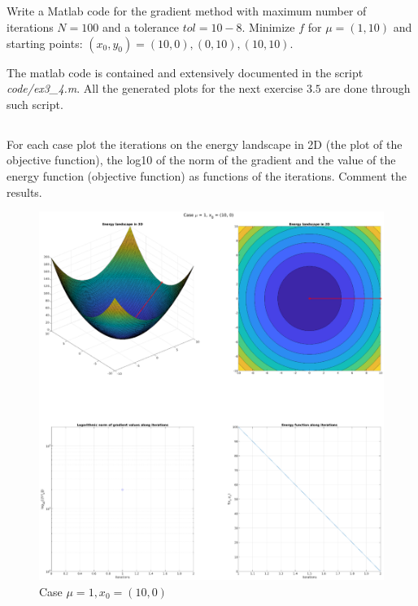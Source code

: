 \documentclass[unicode,11pt,a4paper,oneside,numbers=endperiod,openany]{scrartcl}
\begin{document}
\subsection{}
Write a Matlab code for the gradient method with maximum number of iterations $N = 100$ and a tolerance $tol = 10-8$. 
Minimize $f$ for $\mu = (1, 10)$ and starting points: $(x_0 , y_0) = (10, 0), (0, 10), (10, 10)$. \newline

The matlab code is contained and extensively documented in the script \textit{code/ex3\_4.m}.
All the generated plots for the next exercise $3.5$ are done through such script. 

\subsection{}
For each case plot the iterations on the energy landscape in 2D (the plot of the objective function),
the log10 of the norm of the gradient and the value of the energy function (objective function) as functions of the iterations. 
Comment the results.

\begin{figure}[H]
    \centering
    \caption{Case $\mu = 1, x_0 = (10, 0)$}
    \label{fig:ex3-5-mu1-x1000}
    \includegraphics[width=\textwidth, trim={5cm 3cm 5cm 1cm}, clip]{./figures/ex3-5-mu1-x1000.eps}
\end{figure}
\end{document}
